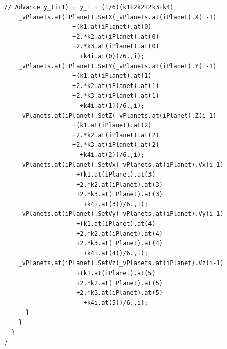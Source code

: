\documentclass[a4paper,12pt]{report}
\begin{document}
\begin{Verbatim}[fontsize=\small]
	// Advance y_(i+1) = y_i + (1/6)(k1+2k2+2k3+k4)
	_vPlanets.at(iPlanet).SetX(_vPlanets.at(iPlanet).X(i-1)
				   +(k1.at(iPlanet).at(0)
				   +2.*k2.at(iPlanet).at(0)
				   +2.*k3.at(iPlanet).at(0)
				     +k4i.at(0))/6.,i);
	_vPlanets.at(iPlanet).SetY(_vPlanets.at(iPlanet).Y(i-1)
				   +(k1.at(iPlanet).at(1)
				   +2.*k2.at(iPlanet).at(1)
				   +2.*k3.at(iPlanet).at(1)
				     +k4i.at(1))/6.,i);
	_vPlanets.at(iPlanet).SetZ(_vPlanets.at(iPlanet).Z(i-1)
				   +(k1.at(iPlanet).at(2)
				   +2.*k2.at(iPlanet).at(2)
				   +2.*k3.at(iPlanet).at(2)
				     +k4i.at(2))/6.,i);
	_vPlanets.at(iPlanet).SetVx(_vPlanets.at(iPlanet).Vx(i-1)
				    +(k1.at(iPlanet).at(3)
				    +2.*k2.at(iPlanet).at(3)
				    +2.*k3.at(iPlanet).at(3)
				      +k4i.at(3))/6.,i);
	_vPlanets.at(iPlanet).SetVy(_vPlanets.at(iPlanet).Vy(i-1)
				    +(k1.at(iPlanet).at(4)
				    +2.*k2.at(iPlanet).at(4)
				    +2.*k3.at(iPlanet).at(4)
				      +k4i.at(4))/6.,i);
	_vPlanets.at(iPlanet).SetVz(_vPlanets.at(iPlanet).Vz(i-1)
				    +(k1.at(iPlanet).at(5)
				    +2.*k2.at(iPlanet).at(5)
				    +2.*k3.at(iPlanet).at(5)
				      +k4i.at(5))/6.,i);
      }
    }
  }
}
 \end{Verbatim}
 \doublespacing
 
\nocite{*}


\end{document}
